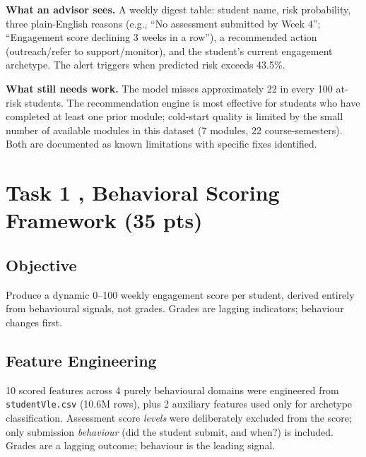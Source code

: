 \documentclass[10pt,a4paper]{article}
\begin{document}
\begin{execbox}
\medskip
\textbf{What an advisor sees.} A weekly digest table: student name, risk probability, three
plain-English reasons (e.g., ``No assessment submitted by Week 4''; ``Engagement score
declining 3 weeks in a row''), a recommended action (outreach/refer to support/monitor),
and the student's current engagement archetype. The alert triggers when predicted risk
exceeds 43.5\%.

\medskip
\textbf{What still needs work.} The model misses approximately 22 in every 100 at-risk
students. The recommendation engine is most effective for students who have completed at
least one prior module; cold-start quality is limited by the small number of available modules
in this dataset (7 modules, 22 course-semesters). Both are documented as known limitations
with specific fixes identified.
\end{execbox}

\newpage


\section{Task 1 , Behavioral Scoring Framework \textnormal{\small(35 pts)}}

\subsection{Objective} Produce a dynamic 0–100 weekly engagement score per student, derived
entirely from behavioural signals, not grades. Grades are lagging indicators; behaviour
changes first.

\subsection{Feature Engineering} 10 scored features across 4 purely behavioural domains
were engineered from \texttt{studentVle.csv} (10.6M rows), plus 2 auxiliary features used
only for archetype classification. Assessment score \emph{levels} were deliberately excluded
from the score; only submission \emph{behaviour} (did the student submit, and when?) is
included. Grades are a lagging outcome; behaviour is the leading signal.
\end{document}
